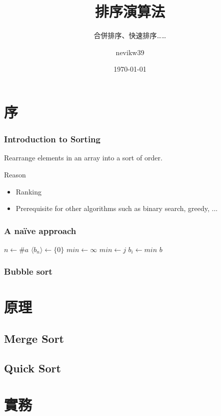 \documentclass{beamer}
\title{排序演算法}
\subtitle{合併排序、快速排序……}
\author{nevikw39}
\institute{點石學園}
\date{\today}
\begin{document}
\frame{\titlepage}

\frame{\tableofcontents}

\section{序}

\frame
{
	\frametitle{Introduction to Sorting}
	
	\begin{definition}
		Rearrange elements in an array into a sort of order.
	\end{definition}
	
	\begin{block}{Reason}
		\begin{itemize}
			\item Ranking
			\item Prerequisite for other algorithms such as binary search, greedy, ...
		\end{itemize}
	\end{block}
}

\frame
{
	\frametitle{A na\"{i}ve approach}
	
	\begin{algorithmic}
            \State$n\gets\#a$
            \State$\langle b_n\rangle\gets\{0\}$
            \For{$i \in [0, n)$}
                \State$min\gets\infty$
						\State$min\gets j$
					\EndIf
				\EndFor
				\State$b_i\gets min$
            \EndFor
            \State\Return$b$
        \EndProcedure
	\end{algorithmic}
}

\frame
{
	\frametitle{Bubble sort}
}

\section{原理}

\subsection{Merge Sort}

\subsection{Quick Sort}

\section{實務}
\end{document}
